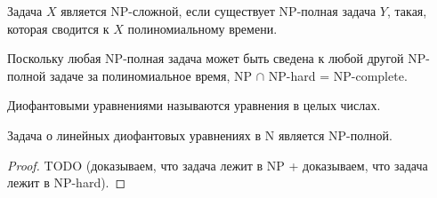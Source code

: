     \begin{Def}
         Задача $X$ является NP-сложной, если существует NP-полная задача $Y$, такая, которая сводится к $X$ полиномиальному времени.
    \end{Def}
    \begin{Rem}
        Поскольку любая NP-полная задача может быть сведена к любой другой NP-полной задаче за полиномиальное время, 
        NP $\cap$ NP-hard = NP-complete.
    \end{Rem}
    \begin{Def}
        Диофантовыми уравнениями называются уравнения в целых числах.
    \end{Def}
    \begin{Thm}
        Задача о линейных диофантовых уравнениях в N является NP-полной.
    \end{Thm}
    \begin{proof}
        TODO (доказываем, что задача лежит в NP + доказываем, что задача лежит в NP-hard).
    \end{proof}

